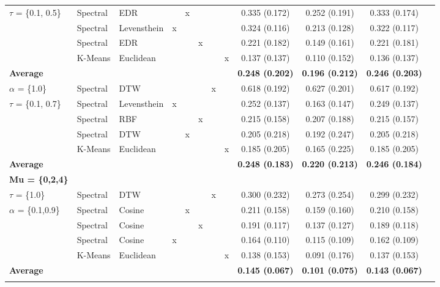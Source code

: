 \documentclass[12pt,a4paper,bibliography=totocnumbered,listof=totocnumbered]{scrartcl}
\begin{document}
\begin{threeparttable}[!htbp]
{\begin{tabular}{@{\extracolsep{0pt}} lllccccccccc}
		$\tau$ =  \{0.1, 0.5\} & Spectral & EDR &  & x &  &  &  & 0.335 (0.172) & 0.252 (0.191) & 0.333 (0.174) \\ 
		& Spectral & Levensthein & x &  &  &  &  & 0.324 (0.116) & 0.213 (0.128) & 0.322 (0.117) \\ 
		& Spectral & EDR &  &  & x &  &  & 0.221 (0.182) & 0.149 (0.161) & 0.221 (0.181) \\ 
		& K-Means & Euclidean &  &  &  &  & x & 0.137 (0.137) & 0.110 (0.152) & 0.136 (0.137) \\ 
		\hline
		\textbf{Average}  &  &  &  &  &  &  &  &  \textbf{0.248 (0.202)} &  \textbf{0.196 (0.212)} &  \textbf{0.246 (0.203)} \\ 
			\hline
		$\alpha$ = \{1.0\} & Spectral & DTW &  &  &  & x &  & 0.618 (0.192) & 0.627 (0.201) & 0.617 (0.192) \\ 
		$\tau$ = \{0.1, 0.7\} & Spectral & Levensthein & x &  &  &  &  & 0.252 (0.137) & 0.163 (0.147) & 0.249 (0.137) \\ 
		& Spectral & RBF &  &  & x &  &  & 0.215 (0.158) & 0.207 (0.188) & 0.215 (0.157) \\ 
		& Spectral & DTW &  & x &  &  &  & 0.205 (0.218) & 0.192 (0.247) & 0.205 (0.218) \\ 
		& K-Means & Euclidean &  &  &  &  & x & 0.185 (0.205) & 0.165 (0.225) & 0.185 (0.205) \\ 
		\hline
		\textbf{Average} &  &  &  &  &  &  &  &  \textbf{0.248 (0.183)} &  \textbf{0.220 (0.213)} &  \textbf{0.246 (0.184)} \\ 
				\hline
		\textbf{Mu = \{0,2,4\}}\tnote{*} &  &  &  &  &  &  &  &  &  &  \\ 
		\hline
		$\tau$ = \{1.0\}  & Spectral & DTW &  &  &  & x &  & 0.300 (0.232) & 0.273 (0.254) & 0.299 (0.232) \\ 
		$\alpha$ = \{0.1,0.9\} & Spectral & Cosine &  & x &  &  &  & 0.211 (0.158) & 0.159 (0.160) & 0.210 (0.158) \\ 
		& Spectral & Cosine &  &  & x &  &  & 0.191 (0.117) & 0.137 (0.127) & 0.189 (0.118) \\ 
		& Spectral & Cosine & x &  &  &  &  & 0.164 (0.110) & 0.115 (0.109) & 0.162 (0.109) \\ 
		& K-Means & Euclidean &  &  &  &  & x & 0.138 (0.153) & 0.091 (0.176) & 0.137 (0.153) \\ 
		\hline
		\textbf{Average}  &  &  &  &  &  &  &  &  \textbf{0.145 (0.067)} &  \textbf{0.101 (0.075)} &  \textbf{0.143 (0.067)} \\ 
		\hline \\[-1.8ex] 

\end{tabular}}
\end{threeparttable}
\end{document}
